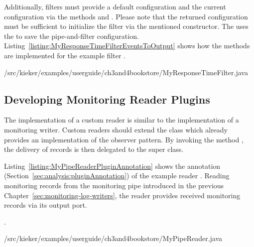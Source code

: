 \noindent Additionally, filters must provide a default configuration and the %
current configuration via the methods  and %
. Please note that the returned configuration %
must be sufficient to initialize the filter via the mentioned constructor. %
The  uses the  to %
save the pipe-and-filter configuration. Listing~\ref{listing:MyResponseTimeFilterEventsToOutput} %
shows how the methods are implemented for the example filter . %

\setJavaCodeListing
%
{\customComponentsBookstoreApplicationDir/src/kieker/examples/userguide/ch3and4bookstore/MyResponseTimeFilter.java}

\subsection{Developing Monitoring Reader Plugins}\label{sec:analysis:reader}

\noindent The implementation of a custom reader is similar to the implementation of a %
monitoring writer. Custom readers should extend the class  %
which already provides an implementation of the observer pattern. %
By invoking the method ,  the delivery of records is then %
delegated to the super class.

Listing~\ref{listing:MyPipeReaderPluginAnnotation} shows the  annotation %
(Section~\ref{sec:analysis:pluginAnnotation}) of the example reader %
. Reading monitoring records from the monitoring %
pipe introduced in the previous Chapter~\ref{sec:monitoring-log-writers}, %
the reader provides received monitoring records via its output port.

% 

.

\setJavaCodeListing
%
{\customComponentsBookstoreApplicationDir/src/kieker/examples/userguide/ch3and4bookstore/MyPipeReader.java}

